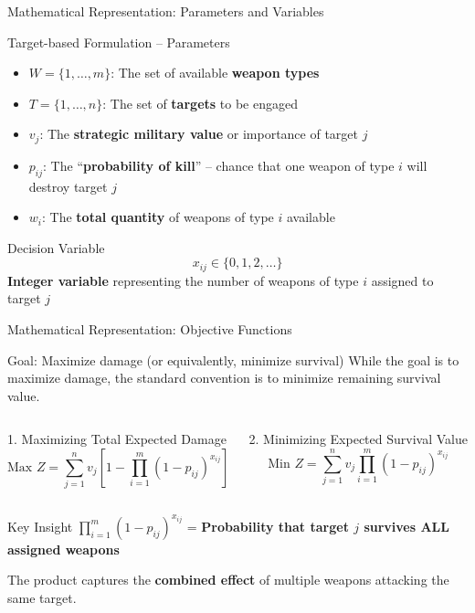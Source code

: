 \documentclass[aspectratio=43,8pt]{beamer}
\begin{document}
\begin{frame}{Mathematical Representation: Parameters and Variables}
\begin{block}{Target-based Formulation -- Parameters}
\begin{itemize}
    \item $W = \{1, \dots, m\}$: The set of available \textbf{weapon types}
    \item $T = \{1, \dots, n\}$: The set of \textbf{targets} to be engaged
    \item $v_j$: The \textbf{strategic military value} or importance of target $j$
    \item $p_{ij}$: The ``\textbf{probability of kill}'' -- chance that one weapon of type $i$ will destroy target $j$
    \item $w_i$: The \textbf{total quantity} of weapons of type $i$ available
\end{itemize}
\end{block}

\vspace{0.3cm}
\begin{exampleblock}{Decision Variable}
$$x_{ij} \in \{0, 1, 2, \dots\}$$
\textbf{Integer variable} representing the number of weapons of type $i$ assigned to target $j$
\end{exampleblock}
\end{frame}

\begin{frame}{Mathematical Representation: Objective Functions}
\begin{block}{Goal: Maximize damage (or equivalently, minimize survival)}
While the goal is to maximize damage, the standard convention is to minimize remaining survival value.
\end{block}

\vspace{0.2cm}
\begin{columns}[t]
\begin{alertblock}{1. Maximizing Total Expected Damage}
\begin{equation*}
\text{Max } Z = \sum_{j=1}^{n} v_j \left[ 1 - \prod_{i=1}^{m} (1 - p_{ij})^{x_{ij}} \right]
\end{equation*}
\end{alertblock}

\begin{exampleblock}{2. Minimizing Expected Survival Value}
\begin{equation*}
\text{Min } Z = \sum_{j=1}^{n} v_j \prod_{i=1}^{m} (1 - p_{ij})^{x_{ij}}
\end{equation*}
\end{exampleblock}
\end{columns}

\vspace{0.3cm}
\begin{block}{Key Insight}
$\prod_{i=1}^{m} (1 - p_{ij})^{x_{ij}}$ = \textbf{Probability that target $j$ survives ALL assigned weapons}

The product captures the \textbf{combined effect} of multiple weapons attacking the same target.
\end{block}
\end{frame}
\end{document}
